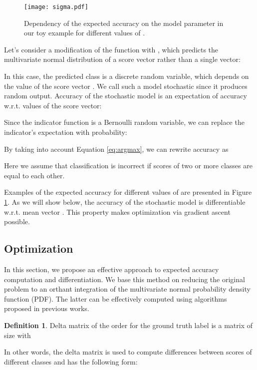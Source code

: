 \documentclass[nohyperref]{article}
\theoremstyle{plain}
\theoremstyle{definition}
\newtheorem{definition}[theorem]{Definition}
\theoremstyle{remark}
\begin{document}
\begin{figure}[t]
\vskip 0.1in
\centering
\texttt{[image: sigma.pdf]}
\caption{Dependency of the expected accuracy on the model parameter in our toy example for different values of .}
\label{fig:sigma}
\vskip -0.1in
\end{figure}

Let's consider a modification of the function  with , which predicts the multivariate normal distribution of a score vector  rather than a single vector:


In this case, the predicted class  is a discrete random variable, which depends on the value of the score vector . We call such a model stochastic since it produces random output. Accuracy of the stochastic model is an expectation of accuracy w.r.t. values of the score vector:

Since the indicator function is a Bernoulli random variable, we can replace the indicator's expectation with probability:

By taking into account Equation \ref{eq:argmax}, we can rewrite accuracy as

Here we assume that classification is incorrect if scores of two or more classes are equal to each other.

Examples of the expected accuracy for different values of  are presented in Figure \ref{fig:sigma}. As we will show below, the accuracy of the stochastic model is differentiable w.r.t. mean vector . This property makes optimization via gradient ascent possible.

\subsection{Optimization}
In this section, we propose an effective approach to expected accuracy computation and differentiation. We base this method on reducing the original problem to an orthant integration of the multivariate normal probability density function (PDF). The latter can be effectively computed using algorithms proposed in previous works.



\vskip 0.05in
\begin{definition}
Delta matrix  of the order  for the ground truth label  is a matrix of size  with

\end{definition}
In other words, the delta matrix is used to compute differences between scores of different classes and has the following form:
\end{document}
